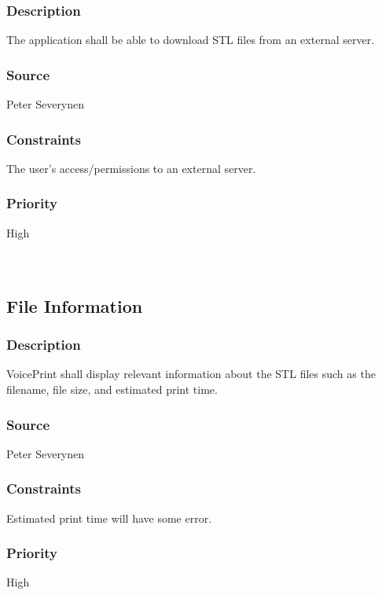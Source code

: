 \subsubsection{Description}
The application shall be able to download STL files from an external server.
\subsubsection{Source}
Peter Severynen
\subsubsection{Constraints}
The user's access/permissions to an external server.
\subsubsection{Priority}
High\\
\\
\\
\subsection{File Information}
\subsubsection{Description}
VoicePrint shall display relevant information about the STL files such as the filename, file size, and estimated print time.
\subsubsection{Source}
Peter Severynen
\subsubsection{Constraints}
Estimated print time will have some error.
\subsubsection{Priority}
High